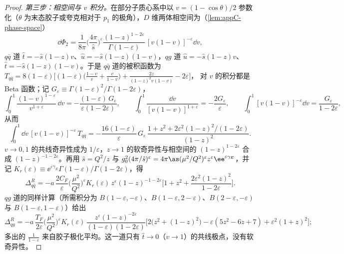 \begin{proof}
\emph{第三步：相空间与 $v$ 积分。}在部分子质心系中以 $v=(1-\cos\theta)/2$ 参数化（$\theta$ 为末态胶子或夸克相对于 $p_1$ 的极角），$D$ 维两体相空间为（\cref{lem:appC-phase-space}）
\[
\dd\Phi_2=\frac{1}{8\pi}\Big(\frac{4\pi}{\hat s}\Big)^{\varepsilon}\frac{(1-z)^{1-2\varepsilon}}{\Gamma(1-\varepsilon)}\,[v(1-v)]^{-\varepsilon}\dd v,
\]
$q\bar q$ 道 $\hat t=-\hat s(1-z)v$、$\hat u=-\hat s(1-z)(1-v)$，$qg$ 道 $\hat u=-\hat s(1-z)v$、$\hat t=-\hat s(1-z)(1-v)$。于是 $q\bar q$ 道的被积函数为
$T_{q\bar q}=8(1-\varepsilon)\big[(1-\varepsilon)\big(\frac{1-v}{v}+\frac{v}{1-v}\big)+\frac{2z}{(1-z)^2v(1-v)}-2\varepsilon\big]$，
对 $v$ 的积分都是 Beta 函数；记 $G_\varepsilon\equiv\Gamma(1-\varepsilon)^2/\Gamma(1-2\varepsilon)$，
\[
\int_0^1\!\frac{(1-v)^{1-\varepsilon}}{v^{1+\varepsilon}}\,\dd v=-\frac{(1-\varepsilon)\,G_\varepsilon}{\varepsilon(1-2\varepsilon)},\qquad
\int_0^1\!\frac{\dd v}{[v(1-v)]^{1+\varepsilon}}=-\frac{2G_\varepsilon}{\varepsilon},\qquad
\int_0^1\![v(1-v)]^{-\varepsilon}\dd v=\frac{G_\varepsilon}{1-2\varepsilon},
\]
从而
\[
\int_0^1\!\dd v\,[v(1-v)]^{-\varepsilon}\,T_{q\bar q}=-\frac{16(1-\varepsilon)}{\varepsilon}\,G_\varepsilon\,\frac{1+z^2+2\varepsilon^2(1-z)^2/(1-2\varepsilon)}{(1-z)^2}.
\]
$v\to0,1$ 的共线奇异性成为 $1/\varepsilon$，$z\to1$ 的软奇异性与相空间的 $(1-z)^{1-2\varepsilon}$ 合成 $(1-z)^{-1-2\varepsilon}$。再用 $\hat s=Q^2/z$ 与 $g_0^2(4\pi/\hat s)^\varepsilon=4\pi\as(\mu^2/Q^2)^\varepsilon z^\varepsilon\ee^{\varepsilon\gamma_E}$，并记 $K_r(\varepsilon)\equiv\ee^{\varepsilon\gamma_E}\Gamma(1-\varepsilon)/\Gamma(1-2\varepsilon)$，得
\begin{equation}\label{eq:dy-real-qq}
\Delta^R_{q\bar q}=-a\,\frac{2C_F}{\varepsilon}\Big(\frac{\mu^2}{Q^2}\Big)^{\varepsilon}K_r(\varepsilon)\,z^{\varepsilon}(1-z)^{-1-2\varepsilon}\Big[1+z^2+\frac{2\varepsilon^2(1-z)^2}{1-2\varepsilon}\Big].
\end{equation}
$qg$ 道的同样计算（所需积分为 $B(1-\varepsilon,-\varepsilon)$、$B(1-\varepsilon,2-\varepsilon)$、$B(2-\varepsilon,-\varepsilon)$ 与 $B(1-\varepsilon,1-\varepsilon)$）给出
\begin{equation}\label{eq:dy-real-qg}
\Delta^R_{qg}=-a\,\frac{T_F}{2\varepsilon}\Big(\frac{\mu^2}{Q^2}\Big)^{\varepsilon}K_r(\varepsilon)\,\frac{z^{\varepsilon}(1-z)^{-2\varepsilon}}{(1-\varepsilon)(1-2\varepsilon)}\Big[2\big(z^2+(1-z)^2\big)-\varepsilon(5z^2-6z+7)+\varepsilon^2(1+z)^2\Big];
\end{equation}
多出的 $\frac1{1-\varepsilon}$ 来自胶子极化平均。这一道只有 $\hat t\to0$（$v\to1$）的共线极点，没有软奇异性。


\end{proof}
